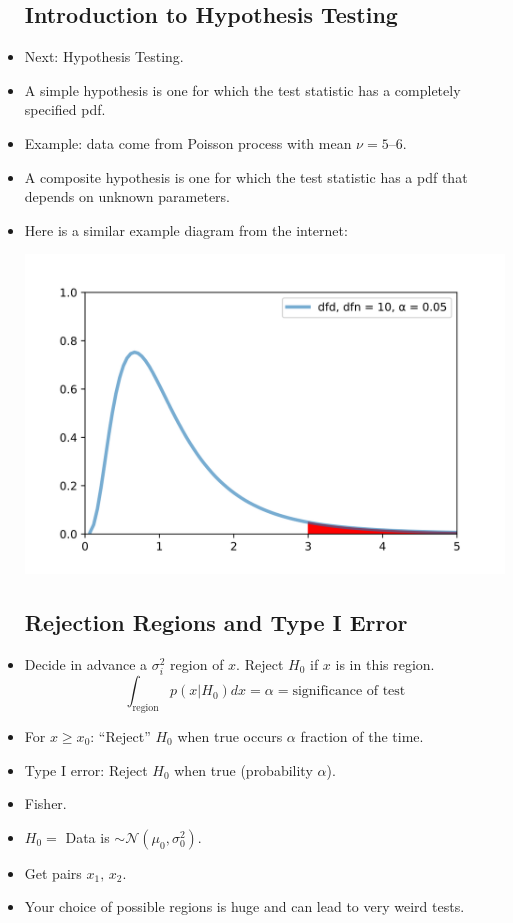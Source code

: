 \begin{itemize}
          \subsection{Introduction to Hypothesis Testing}
    \item Next: Hypothesis Testing.
    \item A simple hypothesis is one for which the test statistic has a completely specified pdf.
    \item Example: data come from Poisson process with mean $\nu = 5$–$6$.
    \item A composite hypothesis is one for which the test statistic has a pdf that depends on unknown parameters.

    \item Here is a similar example diagram from the internet:

          \includegraphics[width = 0.5\linewidth]{Images/lec14-ftest.png}

          \subsection{Rejection Regions and Type I Error}
    \item Decide in advance a $\sigma_i^2$ region of $x$. Reject $H_0$ if $x$ is in this region.
          \[
              \int_{\text{region}} p(x|H_0) dx = \alpha = \text{significance of test}
          \]
    \item For $x \ge x_0$: “Reject” $H_0$ when true occurs $\alpha$ fraction of the time.
    \item Type I error: Reject $H_0$ when true (probability $\alpha$).
    \item Fisher.
    \item $H_0 =$ Data is $\sim \mathcal{N}(\mu_0, \sigma_0^2)$.
    \item Get pairs $x_1, \, x_2$.
    \item Your choice of possible regions is huge and can lead to very weird tests.


\end{itemize}
